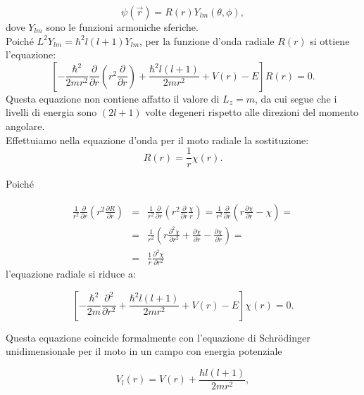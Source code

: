 \documentclass[a4paper,12pt,oneside]{book}
\begin{document}
\begin{equation}
\psi\left(\vec{r}\right)=R\left(r\right)Y_{lm}\left(\theta,\phi\right) ,
\end{equation}
dove $Y_{lm}$ sono le funzioni armoniche sferiche.\\
Poiché $L^2Y_{lm}=\hbar^2l\left(l+1\right)Y_{lm}$, per la funzione d'onda radiale $R\left(r\right)$ si ottiene l'equazione:
\begin{equation}
\left[-\frac{\hbar^2}{2mr^2}\frac{\partial}{\partial r}\left(r^2\frac{\partial}{\partial r}\right)+\frac{\hbar^2l\left(l+1\right)}{2mr^2}+V\left(r\right)-E\right]R\left(r\right)=0 .
\end{equation}
Questa equazione non contiene affatto il valore di $L_z=m$, da cui segue che i livelli di energia sono $\left(2l+1\right)$ volte degeneri rispetto alle direzioni del momento angolare.\\
Effettuiamo nella equazione d'onda per il moto radiale la sostituzione:
\begin{equation}
R\left(r\right)=\frac{1}{r}\chi\left(r\right) .
\end{equation}

Poiché

\begin{eqnarray}
\frac{1}{r^2}\frac{\partial}{\partial r}\left(r^2\frac{\partial R}{\partial r}\right)&=&\frac{1}{r^2}\frac{\partial}{\partial r}\left(r^2\frac{\partial}{\partial r}\frac{\chi}{r}\right)=\frac{1}{r^2}\frac{\partial}{\partial r}\left(r \frac{\partial\chi}{\partial r}-\chi\right)= \nonumber \\
&=& \frac{1}{r^2}\left(r\frac{\partial^2\chi}{\partial r^2}+\frac{\partial\chi}{\partial r}-\frac{\partial\chi}{\partial r}\right)= \nonumber \\
&= & \frac{1}{r}\frac{\partial^2 \chi}{\partial r^2}
\end{eqnarray}
l'equazione radiale si riduce a:

\begin{equation}
\left[-\frac{\hbar^2}{2m}\frac{\partial^2}{\partial r^2}+\frac{\hbar^2l\left(l+1\right)}{2mr^2}+V\left(r\right)-E\right]\chi\left(r\right)=0 .
\end{equation}

Questa equazione coincide formalmente con l'equazione di Schr\"{o}dinger unidimensionale per il moto in un campo con energia potenziale

\begin{equation}
V_l\left(r\right)=V\left(r\right)+\frac{\hbar l\left(l+1\right)}{2mr^2} ,
\end{equation}
\end{document}
